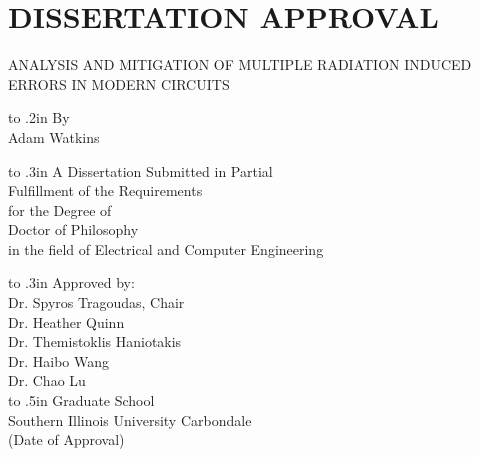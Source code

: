 

\chapter*{DISSERTATION APPROVAL} 


\thispagestyle{empty}

\begin{center}
\medskip
ANALYSIS AND MITIGATION OF MULTIPLE RADIATION INDUCED ERRORS IN MODERN CIRCUITS

\vbox to .2in{}
By \\
Adam Watkins

\vbox to .3in{}
A Dissertation Submitted in Partial \\
Fulfillment of the Requirements \\
for the Degree of \\
Doctor of Philosophy \\
in the field of Electrical and Computer Engineering

\vbox to .3in{}
Approved by: \\
Dr. Spyros Tragoudas, Chair \\
Dr. Heather Quinn \\
Dr. Themistoklis Haniotakis \\
Dr. Haibo Wang \\
Dr. Chao Lu \\

\baselineskip=14pt
\vbox to .5in{}
Graduate School \\
Southern Illinois University Carbondale \\
(Date of Approval)
\end{center}

\baselineskip=24pt
\newpage

